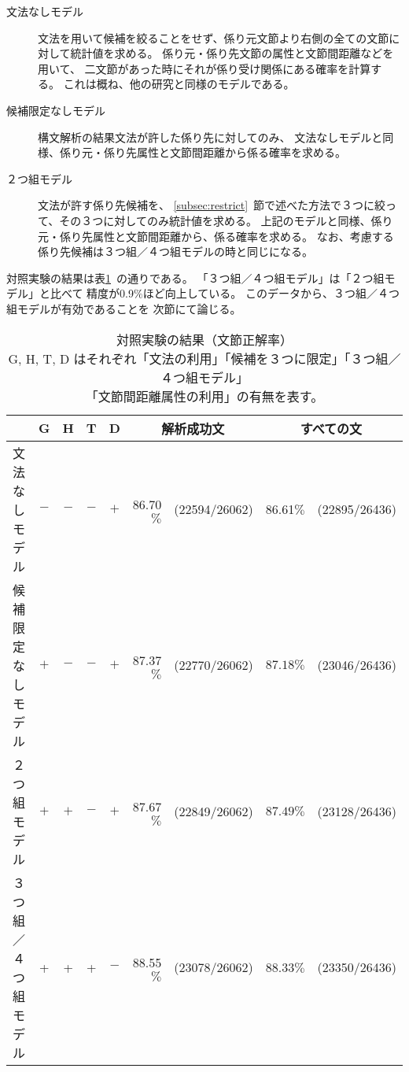 \begin{description}
\item[文法なしモデル]
文法を用いて候補を絞ることをせず、係り元文節より右側の全ての文節に対して統計値を求める。
係り元・係り先文節の属性と文節間距離などを用いて、
二文節があった時にそれが係り受け関係にある確率を計算する。
これは概ね、他の研究と同様のモデルである。
\item[候補限定なしモデル]
構文解析の結果文法が許した係り先に対してのみ、
文法なしモデルと同様、係り元・係り先属性と文節間距離から係る確率を求める。
\item[２つ組モデル]
文法が許す係り先候補を、
\ref{subsec:restrict}~節で述べた方法で３つに絞って、その３つに対してのみ統計値を求める。
上記のモデルと同様、係り元・係り先属性と文節間距離から、係る確率を求める。
なお、考慮する係り先候補は３つ組／４つ組モデルの時と同じになる。
\end{description}

対照実験の結果は表\ref{tab:control_exp}~の通りである。
「３つ組／４つ組モデル」は「２つ組モデル」と比べて
精度が0.9$\%$ほど向上している。
このデータから、３つ組／４つ組モデルが有効であることを
次節にて論じる。

\begin{table}[t]
	\begin{center}
	\begin{tabular}{|l|cccc|rc|rc|}
	\hline
	 & G & H & T & D &
	   \multicolumn{2}{c|}{解析成功文} & 
	   \multicolumn{2}{c|}{すべての文} \\
	\hline \hline
	文法なしモデル & $-$ & $-$ & $-$ & $+$ & 86.70$\%$ & (22594/26062) & 86.61$\%$ & (22895/26436) \\
	\hline
	候補限定なしモデル & $+$ & $-$ & $-$ & $+$ & 87.37$\%$ & (22770/26062) & $87.18\%$ & (23046/26436) \\
	\hline
	２つ組モデル & $+$ & $+$ & $-$ & $+$ & 87.67$\%$ & (22849/26062) & $87.49\%$ & (23128/26436) \\ 
	\hline
	３つ組／４つ組モデル & + & + & + & $-$ & 88.55$\%$ & (23078/26062) 
		& 88.33$\%$ & (23350/26436) \\
	\hline
	\end{tabular}
	\caption{対照実験の結果（文節正解率）\\
	{\footnotesize G, H, T, D はそれぞれ「文法の利用」「候補を３つに限定」「３つ組／４つ組モデル」} \\
	{\footnotesize 「文節間距離属性の利用」の有無を表す。}}
	\label{tab:control_exp}
	\end{center}
\end{table}


